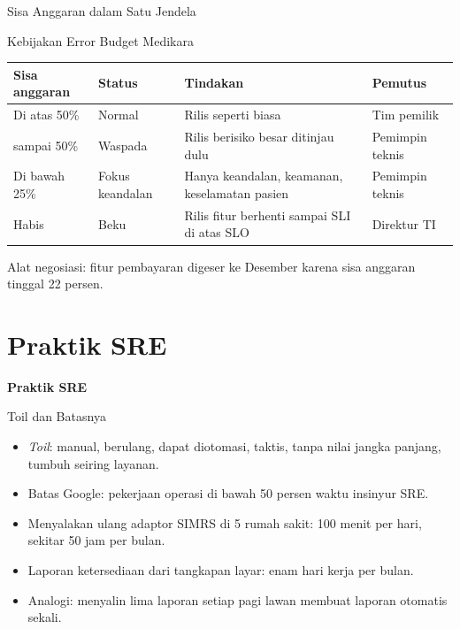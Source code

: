 \documentclass[aspectratio=169, table, 12pt]{beamer}
\begin{document}
\begin{frame}{{\Large Sisa Anggaran dalam Satu Jendela}}
  \centering
\end{frame}

\begin{frame}{{\Large Kebijakan Error Budget Medikara}}
  \footnotesize
  \begin{tabularx}{\textwidth}{>{\raggedright\arraybackslash}p{2.6cm}
      >{\raggedright\arraybackslash}p{2.4cm} >{\raggedright\arraybackslash}X
      >{\raggedright\arraybackslash}p{2.6cm}}
    \hline
    \textbf{Sisa anggaran} & \textbf{Status} & \textbf{Tindakan} & \textbf{Pemutus} \\
    \hline
    Di atas 50\% & Normal & Rilis seperti biasa & Tim pemilik \\
    \hline
    25 sampai 50\% & Waspada & Rilis berisiko besar ditinjau dulu & Pemimpin teknis \\
    \hline
    Di bawah 25\% & Fokus keandalan & Hanya keandalan, keamanan, keselamatan pasien &
      Pemimpin teknis \\
    \hline
    Habis & Beku & Rilis fitur berhenti sampai SLI di atas SLO & Direktur TI \\
    \hline
  \end{tabularx}

  \vspace{10pt}
  \small
  Alat negosiasi: fitur pembayaran digeser ke Desember karena sisa anggaran tinggal 22
  persen.
\end{frame}

\section{Praktik SRE}

\begin{frame}{\hfill}
  \centering
  \Huge{\textbf{Praktik SRE}}
\end{frame}

\begin{frame}{{\Large Toil dan Batasnya}}
  \vspace{10pt}
  \small
  \begin{itemize}
    \item \textit{Toil}: manual, berulang, dapat diotomasi, taktis, tanpa nilai jangka
          panjang, tumbuh seiring layanan.
    \item Batas Google: pekerjaan operasi di bawah 50 persen waktu insinyur SRE.
    \item Menyalakan ulang adaptor SIMRS di 5 rumah sakit: 100 menit per hari, sekitar 50
          jam per bulan.
    \item Laporan ketersediaan dari tangkapan layar: enam hari kerja per bulan.
    \item Analogi: menyalin lima laporan setiap pagi lawan membuat laporan otomatis sekali.
  \end{itemize}
\end{frame}
\end{document}
